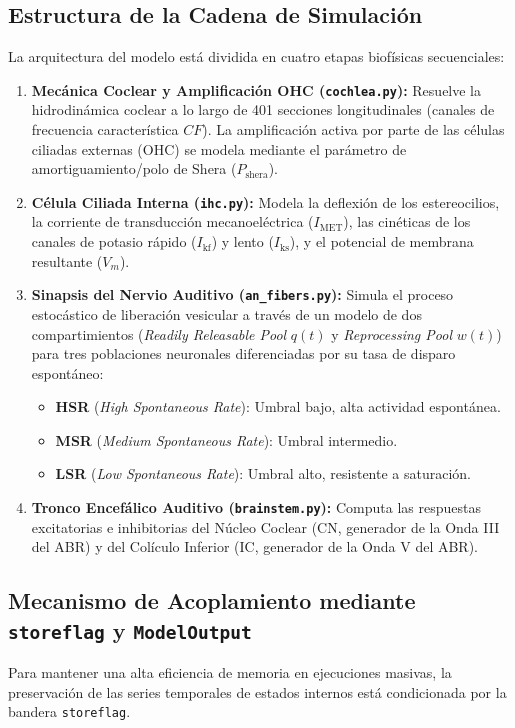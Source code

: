 \documentclass[12pt,a4paper]{article}
\begin{document}
\subsection{Estructura de la Cadena de Simulación}
La arquitectura del modelo está dividida en cuatro etapas biofísicas secuenciales:
\begin{enumerate}
    \item \textbf{Mecánica Coclear y Amplificación OHC (\texttt{cochlea.py}):} Resuelve la hidrodinámica coclear a lo largo de 401 secciones longitudinales (canales de frecuencia característica $CF$). La amplificación activa por parte de las células ciliadas externas (OHC) se modela mediante el parámetro de amortiguamiento/polo de Shera ($P_{\text{shera}}$).
    \item \textbf{Célula Ciliada Interna (\texttt{ihc.py}):} Modela la deflexión de los estereocilios, la corriente de transducción mecanoeléctrica ($I_{\text{MET}}$), las cinéticas de los canales de potasio rápido ($I_{\text{kf}}$) y lento ($I_{\text{ks}}$), y el potencial de membrana resultante ($V_m$).
    \item \textbf{Sinapsis del Nervio Auditivo (\texttt{an\_fibers.py}):} Simula el proceso estocástico de liberación vesicular a través de un modelo de dos compartimientos (\emph{Readily Releasable Pool} $q(t)$ y \emph{Reprocessing Pool} $w(t)$) para tres poblaciones neuronales diferenciadas por su tasa de disparo espontáneo:
    \begin{itemize}
        \item \textbf{HSR} (\emph{High Spontaneous Rate}): Umbral bajo, alta actividad espontánea.
        \item \textbf{MSR} (\emph{Medium Spontaneous Rate}): Umbral intermedio.
        \item \textbf{LSR} (\emph{Low Spontaneous Rate}): Umbral alto, resistente a saturación.
    \end{itemize}
    \item \textbf{Tronco Encefálico Auditivo (\texttt{brainstem.py}):} Computa las respuestas excitatorias e inhibitorias del Núcleo Coclear (CN, generador de la Onda III del ABR) y del Colículo Inferior (IC, generador de la Onda V del ABR).
\end{enumerate}

\subsection{Mecanismo de Acoplamiento mediante \texttt{storeflag} y \texttt{ModelOutput}}
Para mantener una alta eficiencia de memoria en ejecuciones masivas, la preservación de las series temporales de estados internos está condicionada por la bandera \texttt{storeflag}.
\end{document}
